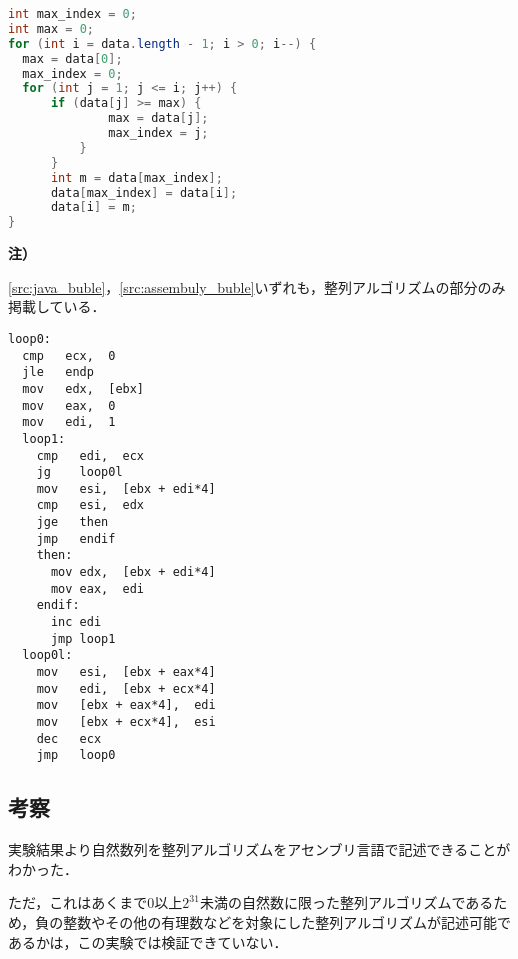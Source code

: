 \begin{minipage}[t]{0.5\linewidth}
    \centering
    \begin{lstlisting}[caption={{\ttfamily Java}}, label={src:java_buble}, language={Java},frame={left}]
int max_index = 0;
int max = 0;
for (int i = data.length - 1; i > 0; i--) {
  max = data[0];
  max_index = 0;
  for (int j = 1; j <= i; j++) {
      if (data[j] >= max) {
              max = data[j];
              max_index = j;
          }
      }
      int m = data[max_index];
      data[max_index] = data[i];
      data[i] = m;
}
    \end{lstlisting}
    \begin{flushleft}
        \begin{framed}
            \noindent\textbf{注）}\par
            \ref{src:java_buble}，\ref{src:assembuly_buble}いずれも，整列アルゴリズムの部分のみ掲載している．
        \end{framed}
    \end{flushleft}
\end{minipage}
\hspace{3em}
\begin{minipage}[t]{0.4\linewidth}
    \begin{lstlisting}[frame={left},caption={アセンブリ},label={src:assembuly_buble}]
loop0:
  cmp   ecx,  0
  jle   endp
  mov   edx,  [ebx]
  mov   eax,  0    
  mov   edi,  1
  loop1:
    cmp   edi,  ecx
    jg    loop0l
    mov   esi,  [ebx + edi*4]
    cmp   esi,  edx
    jge   then
    jmp   endif
    then:
      mov edx,  [ebx + edi*4]
      mov eax,  edi          
    endif:
      inc edi
      jmp loop1
  loop0l:
    mov   esi,  [ebx + eax*4]
    mov   edi,  [ebx + ecx*4]
    mov   [ebx + eax*4],  edi
    mov   [ebx + ecx*4],  esi
    dec   ecx
    jmp   loop0
\end{lstlisting}
\end{minipage}
\subsection{考察}
実験結果より自然数列を整列アルゴリズムをアセンブリ言語で記述できることがわかった．\par
ただ，これはあくまで\(0\)以上\(2^{31}\)未満の自然数に限った整列アルゴリズムであるため，負の整数やその他の有理数などを対象にした整列アルゴリズムが記述可能であるかは，この実験では検証できていない．